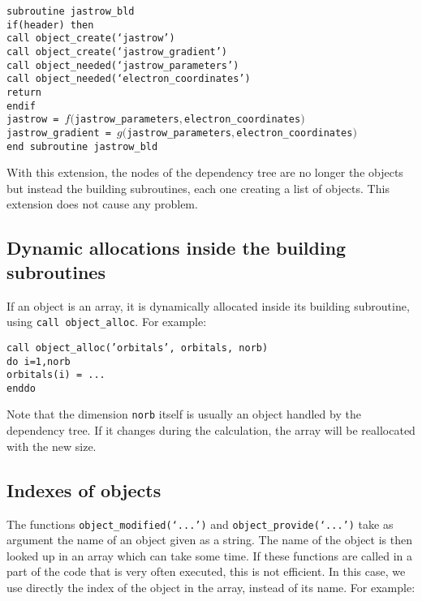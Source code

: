 \documentclass[a4paper,11pt]{article}
\begin{document}
\vspace{0.5cm}
\noindent
{\tt subroutine jastrow_bld\\
if(header) then\\
\phantom{xx} call object_create(`jastrow')\\
\phantom{xx} call object_create(`jastrow_gradient')\\
\phantom{xx} call object_needed(`jastrow_parameters')\\
\phantom{xx} call object_needed(`electron_coordinates')\\
\phantom{xx} return\\
endif\\
jastrow  = $f(${\tt jastrow_parameters}$,${\tt electron_coordinates}$)$\\
jastrow_gradient  = $g(${\tt jastrow_parameters}$,${\tt electron_coordinates}$)$\\
end subroutine jastrow_bld}

\vspace{0.5cm}
With this extension, the nodes of the dependency tree are no longer the objects but instead the building subroutines, each one creating a list of objects. This extension does not cause any problem.

\subsection{Dynamic allocations inside the building subroutines}

If an object is an array, it is dynamically allocated inside its building subroutine, using {\tt call object_alloc}. For example:

\vspace{0.5cm}
\noindent
{\tt call object_alloc('orbitals', orbitals, norb)\\
do i=1,norb\\
\phantom{xx} orbitals(i) = ...\\
enddo}
\vspace{0.5cm}

Note that the dimension {\tt norb} itself is usually an object handled by the dependency tree. If it changes during the calculation, the array will be reallocated with the new size.

\subsection{Indexes of objects}
The functions {\tt object_modified(`...')} and {\tt object_provide(`...')} take as argument the name of an object given as a string. The name of the object is then looked up in an array which can take some time. If these functions are called in a part of the code that is very often executed, this is not efficient. In this case, we use directly the index of the object in the array, instead of its name. For example:
\end{document}
